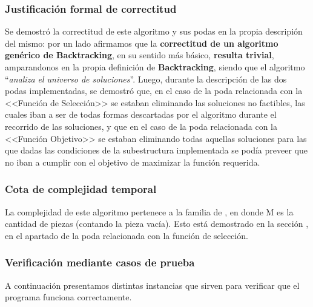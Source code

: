 \documentclass[11pt, a4paper, twoside]{article}
\begin{document}
\subsubsection{Justificación formal de correctitud}
Se demostró la correctitud de este algoritmo y sus podas en la propia descripión
del mismo: por un lado afirmamos que la \textbf{correctitud de un algoritmo
genérico de Backtracking}, en su sentido más básico, \textbf{resulta trivial},
amparandonos en la propia definición de \textbf{Backtracking}, siendo que el
algoritmo ``\emph{analiza el universo de soluciones}''. Luego, durante la
descripción de las dos podas implementadas, se demostró que, en el caso de la
poda relacionada con la <<Función de Selección>> se estaban eliminando las
soluciones no factibles, las cuales iban a ser de todas formas descartadas por
el algoritmo durante el recorrido de las soluciones, y que en el caso de la poda
relacionada con la <<Función Objetivo>> se estaban eliminando todas aquellas
soluciones para las que dadas las condiciones de la subestructura implementada
se podía preveer que no iban a cumplir con el objetivo de maximizar la función
requerida.

\subsubsection{Cota de complejidad temporal}

La complejidad de este algoritmo pertenece a la familia de , en donde M
es la cantidad de piezas (contando la pieza vacía). Esto está demostrado en la
sección , en el apartado de la poda relacionada
con la función de selección.

\subsubsection{Verificación mediante casos de prueba}

A continuación presentamos distintas instancias que sirven para verificar que el
programa funciona correctamente.
\end{document}
